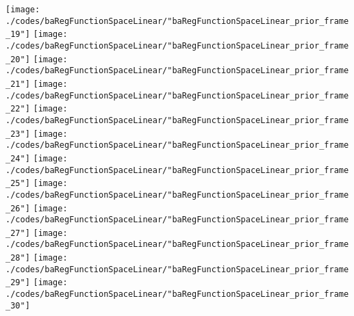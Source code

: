 \begin{frame}{\insertsection}
\begin{center}
{\begin{animateinline}{15}
				 \texttt{[image: ./codes/baRegFunctionSpaceLinear/"baRegFunctionSpaceLinear\_prior\_frame\_19"]}\newframe
				 \texttt{[image: ./codes/baRegFunctionSpaceLinear/"baRegFunctionSpaceLinear\_prior\_frame\_20"]}\newframe
				 \texttt{[image: ./codes/baRegFunctionSpaceLinear/"baRegFunctionSpaceLinear\_prior\_frame\_21"]}\newframe
				 \texttt{[image: ./codes/baRegFunctionSpaceLinear/"baRegFunctionSpaceLinear\_prior\_frame\_22"]}\newframe
				 \texttt{[image: ./codes/baRegFunctionSpaceLinear/"baRegFunctionSpaceLinear\_prior\_frame\_23"]}\newframe
				 \texttt{[image: ./codes/baRegFunctionSpaceLinear/"baRegFunctionSpaceLinear\_prior\_frame\_24"]}\newframe
				 \texttt{[image: ./codes/baRegFunctionSpaceLinear/"baRegFunctionSpaceLinear\_prior\_frame\_25"]}\newframe
				 \texttt{[image: ./codes/baRegFunctionSpaceLinear/"baRegFunctionSpaceLinear\_prior\_frame\_26"]}\newframe
				 \texttt{[image: ./codes/baRegFunctionSpaceLinear/"baRegFunctionSpaceLinear\_prior\_frame\_27"]}\newframe
				 \texttt{[image: ./codes/baRegFunctionSpaceLinear/"baRegFunctionSpaceLinear\_prior\_frame\_28"]}\newframe
				 \texttt{[image: ./codes/baRegFunctionSpaceLinear/"baRegFunctionSpaceLinear\_prior\_frame\_29"]}\newframe
				 \texttt{[image: ./codes/baRegFunctionSpaceLinear/"baRegFunctionSpaceLinear\_prior\_frame\_30"]}
			 \end{animateinline}
			}
	\end{center}
    
\end{frame}

